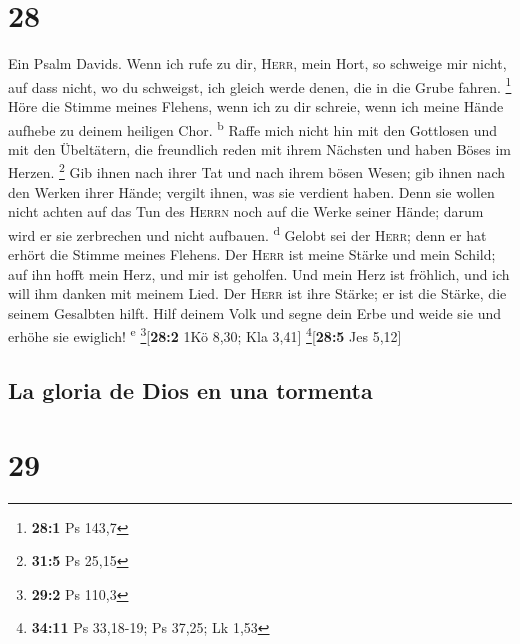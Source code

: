 \hypertarget{section-27}{%
\section{28}\label{section-27}}

 Ein Psalm Davids. Wenn ich rufe zu dir, \textsc{Herr},
mein Hort, so schweige mir nicht, auf dass nicht, wo du schweigst, ich
gleich werde denen, die in die Grube fahren. \footnote{\textbf{28:1} Ps
  143,7}  Höre die Stimme meines Flehens, wenn ich zu dir
schreie, wenn ich meine Hände aufhebe zu deinem heiligen Chor.
\textsuperscript{b}  Raffe mich nicht hin mit den
Gottlosen und mit den Übeltätern, die freundlich reden mit ihrem
Nächsten und haben Böses im Herzen. \footnote{\textbf{31:5} Ps 25,15}
 Gib ihnen nach ihrer Tat und nach ihrem bösen Wesen; gib
ihnen nach den Werken ihrer Hände; vergilt ihnen, was sie verdient
haben.  Denn sie wollen nicht achten auf das Tun des
\textsc{Herrn} noch auf die Werke seiner Hände; darum wird er sie
zerbrechen und nicht aufbauen. \textsuperscript{d}  Gelobt
sei der \textsc{Herr}; denn er hat erhört die Stimme meines Flehens.
 Der \textsc{Herr} ist meine Stärke und mein Schild; auf
ihn hofft mein Herz, und mir ist geholfen. Und mein Herz ist fröhlich,
und ich will ihm danken mit meinem Lied.  Der
\textsc{Herr} ist ihre Stärke; er ist die Stärke, die seinem Gesalbten
hilft.  Hilf deinem Volk und segne dein Erbe und weide sie
und erhöhe sie ewiglich! \textsuperscript{e} \footnote{\textbf{29:2} Ps
  110,3}{[}\textbf{28:2} 1Kö 8,30; Kla 3,41{]}
\footnote{\textbf{34:11} Ps 33,18-19; Ps 37,25; Lk 1,53}{[}\textbf{28:5}
Jes 5,12{]}

\hypertarget{la-gloria-de-dios-en-una-tormenta}{%
\subsection{La gloria de Dios en una
tormenta}\label{la-gloria-de-dios-en-una-tormenta}}

\hypertarget{section-28}{%
\section{29}\label{section-28}}

